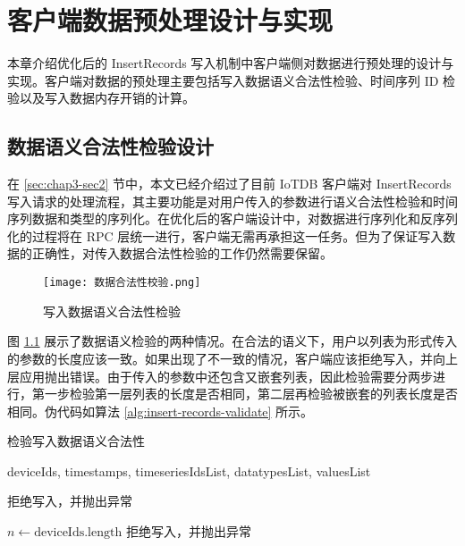 
\chapter{客户端数据预处理设计与实现\label{chap:client-design}}
本章介绍优化后的 InsertRecords 写入机制中客户端侧对数据进行预处理的设计与实现。客户端对数据的预处理主要包括写入数据语义合法性检验、时间序列 ID 检验以及写入数据内存开销的计算。
\section{数据语义合法性检验设计}
在 \ref{sec:chap3-sec2} 节中，本文已经介绍过了目前 IoTDB 客户端对 InsertRecords 写入请求的处理流程，其主要功能是对用户传入的参数进行语义合法性检验和时间序列数据和类型的序列化。在优化后的客户端设计中，对数据进行序列化和反序列化的过程将在 RPC 层统一进行，客户端无需再承担这一任务。但为了保证写入数据的正确性，对传入数据合法性检验的工作仍然需要保留。

\begin{figure}
  \centering
  \texttt{[image: 数据合法性校验.png]}
  \caption{写入数据语义合法性检验}
  \label{fig:client-data-validate}
\end{figure}

图 \ref{fig:client-data-validate} 展示了数据语义检验的两种情况。在合法的语义下，用户以列表为形式传入的参数的长度应该一致。如果出现了不一致的情况，客户端应该拒绝写入，并向上层应用抛出错误。由于传入的参数中还包含又嵌套列表，因此检验需要分两步进行，第一步检验第一层列表的长度是否相同，第二层再检验被嵌套的列表长度是否相同。伪代码如算法 \ref{alg:insert-records-validate} 所示。

\begin{algorithm}
  \caption{检验写入数据语义合法性}
  \label{alg:insert-records-validate}
  \small
  \begin{algorithmic}
    \REQUIRE deviceIds, timestamps, timeseriesIdsList, datatypesList, valuesList

     \STATE 拒绝写入，并抛出异常
    \ENDIF

    \STATE $n \leftarrow \text{deviceIds.length}$
        \STATE 拒绝写入，并抛出异常
      \ENDIF
    \ENDFOR

  \end{algorithmic}
\end{algorithm}

